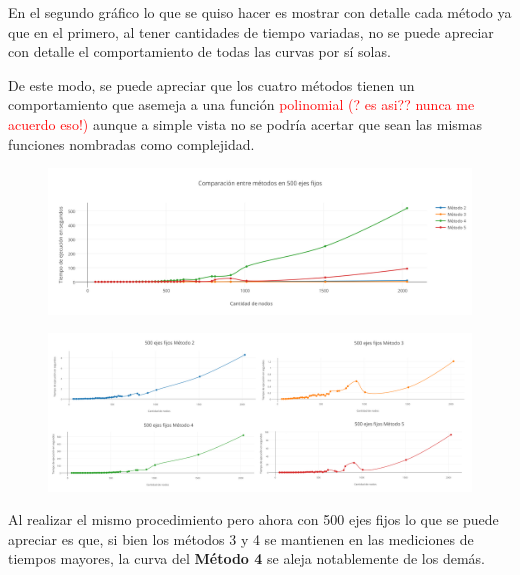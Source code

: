 En el segundo gr\'afico lo que se quiso hacer es mostrar con detalle cada m\'etodo ya que en el primero, al tener cantidades de tiempo variadas, no se puede apreciar con detalle el comportamiento de todas las curvas por s\'i solas.

De este modo, se puede apreciar que los cuatro m\'etodos tienen un comportamiento que asemeja a una funci\'on \textcolor{red}{polinomial (? es asi?? nunca me acuerdo eso!)} aunque a simple vista no se podr\'ia acertar que sean las mismas funciones nombradas como complejidad.

\bigskip  
  
  \begin{figure}[h!]
   \begin{center}
 	\includegraphics[scale=0.55]{imagenes/local/tiempos/500ejes.png}
   \end{center}
 \end{figure}
 
   \begin{figure}[h!]
   \begin{center}
 	\includegraphics[scale=0.08]{imagenes/local/tiempos/500ejes2.png}
   \end{center}
 \end{figure}

Al realizar el mismo procedimiento pero ahora con 500 ejes fijos lo que se puede apreciar es que, si bien los m\'etodos 3 y 4 se mantienen en las mediciones de tiempos mayores, la curva del \textbf{M\'etodo 4} se aleja notablemente de los dem\'as.\\

